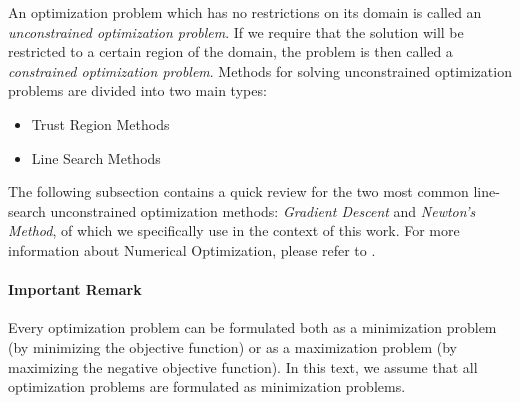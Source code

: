 \noindent An optimization problem which has no restrictions on its domain is called an \emph{unconstrained optimization problem}. If we require that the solution will be restricted to a certain region of the domain, the problem is then called a \emph{constrained optimization problem}. Methods for solving unconstrained optimization problems are divided into two main types:
\begin{itemize}
    \item Trust Region Methods
    \item Line Search Methods
\end{itemize}
The following subsection contains a quick review for the two most common line-search unconstrained optimization methods: \emph{Gradient Descent} and \emph{Newton's Method}, of which we specifically use in the context of this work. For more information about Numerical Optimization, please refer to \cite{Nocedal2006Numerical}.
\paragraph{Important Remark} Every optimization problem can be formulated both as a minimization problem (by minimizing the objective function) or as a maximization problem (by maximizing the negative objective function). In this text, we assume that all optimization problems are formulated as minimization problems.

